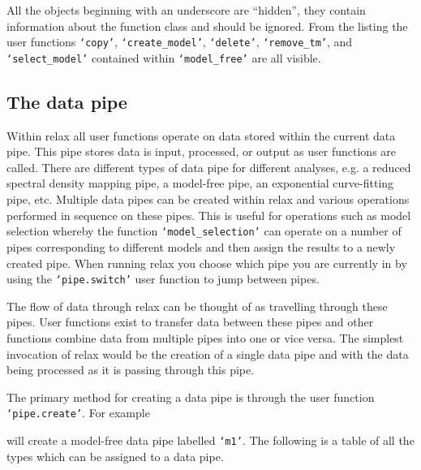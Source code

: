 All the objects beginning with an underscore are ``hidden'', they contain information about the function class and should be ignored.  From the listing the user functions \texttt{`copy'}, \texttt{`create\_model'}, \texttt{`delete'}, \texttt{`remove\_tm'}, and \texttt{`select\_model'} contained within \texttt{`model\_free'} are all visible.




\subsection{The data pipe}

Within relax all user functions operate on data stored within the current data pipe.  This pipe stores data is input, processed, or output as user functions are called.  There are different types of data pipe for different analyses, e.g. a reduced spectral density mapping pipe, a model-free pipe, an exponential curve-fitting pipe, etc.  Multiple data pipes can be created within relax and various operations performed in sequence on these pipes.  This is useful for operations such as model selection whereby the function \texttt{`model\_selection'} can operate on a number of pipes corresponding to different models and then assign the results to a newly created pipe.  When running relax you choose which pipe you are currently in by using the \texttt{`pipe.switch'} user function to jump between pipes. 

The flow of data through relax can be thought of as travelling through these pipes.  User functions exist to transfer data between these pipes and other functions combine data from multiple pipes into one or vice versa.  The simplest invocation of relax would be the creation of a single data pipe and with the data being processed as it is passing through this pipe.

The primary method for creating a data pipe is through the user function \texttt{`pipe.create'}.  For example


will create a model-free data pipe labelled \texttt{`m1'}.  The following is a table of all the types which can be assigned to a data pipe.

